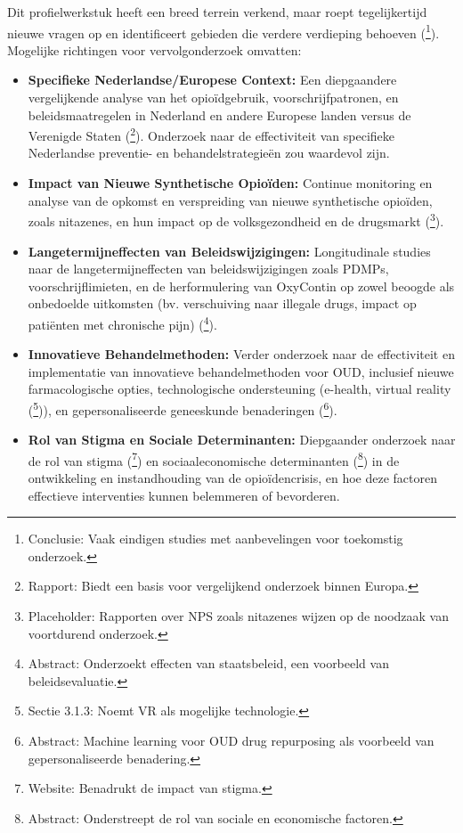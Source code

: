 \documentclass[11pt, a4paper]{report} %
\begin{document}
Dit profielwerkstuk heeft een breed terrein verkend, maar roept tegelijkertijd nieuwe vragen op en identificeert gebieden die verdere verdieping behoeven (\cite{Schuler2020StateScienceOpioidPolicy}\footnote{Conclusie: Vaak eindigen studies met aanbevelingen voor toekomstig onderzoek.}). Mogelijke richtingen voor vervolgonderzoek omvatten:
\begin{itemize}
    \item \textbf{Specifieke Nederlandse/Europese Context:} Een diepgaandere vergelijkende analyse van het opioïdgebruik, voorschrijfpatronen, en beleidsmaatregelen in Nederland en andere Europese landen versus de Verenigde Staten (\cite{EMCDDA2024HeroinGlobal}\footnote{Rapport: Biedt een basis voor vergelijkend onderzoek binnen Europa.}). Onderzoek naar de effectiviteit van specifieke Nederlandse preventie- en behandelstrategieën zou waardevol zijn.
    \item \textbf{Impact van Nieuwe Synthetische Opioïden:} Continue monitoring en analyse van de opkomst en verspreiding van nieuwe synthetische opioïden, zoals nitazenes, en hun impact op de volksgezondheid en de drugsmarkt (\cite{UNODC_NitazeneReport}\footnote{Placeholder: Rapporten over NPS zoals nitazenes wijzen op de noodzaak van voortdurend onderzoek.}).
    \item \textbf{Langetermijneffecten van Beleidswijzigingen:} Longitudinale studies naar de langetermijneffecten van beleidswijzigingen zoals PDMPs, voorschrijflimieten, en de herformulering van OxyContin op zowel beoogde als onbedoelde uitkomsten (bv. verschuiving naar illegale drugs, impact op patiënten met chronische pijn) (\cite{Antonelli2024AutoregressivePanelOpioidPolicies}\footnote{Abstract: Onderzoekt effecten van staatsbeleid, een voorbeeld van beleidsevaluatie.}).
    \item \textbf{Innovatieve Behandelmethoden:} Verder onderzoek naar de effectiviteit en implementatie van innovatieve behandelmethoden voor OUD, inclusief nieuwe farmacologische opties, technologische ondersteuning (e-health, virtual reality (\cite{Yarosh2020ComputationalSupportSUD}\footnote{Sectie 3.1.3: Noemt VR als mogelijke technologie.})), en gepersonaliseerde geneeskunde benaderingen (\cite{Feng2023MLOpioidInteractome}\footnote{Abstract: Machine learning voor OUD drug repurposing als voorbeeld van gepersonaliseerde benadering.}).
    \item \textbf{Rol van Stigma en Sociale Determinanten:} Diepgaander onderzoek naar de rol van stigma (\cite{CDCStigmaReduction}\footnote{Website: Benadrukt de impact van stigma.}) en sociaaleconomische determinanten (\cite{Dasgupta2018OpioidCrisisSocialEconomicDeterminants}\footnote{Abstract: Onderstreept de rol van sociale en economische factoren.}) in de ontwikkeling en instandhouding van de opioïdencrisis, en hoe deze factoren effectieve interventies kunnen belemmeren of bevorderen.

\end{itemize}
\end{document}
